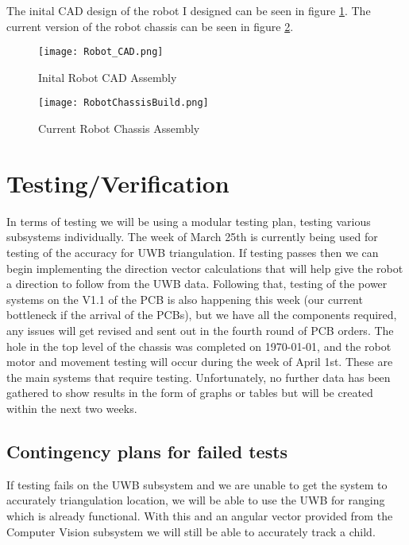 \documentclass{report}
\begin{document}
    The inital CAD design of the robot I designed can be seen in figure \ref{fig:Robot_CAD}. The current version of the robot chassis can be seen in figure \ref{fig:RobotChassisBuild}.

    \begin{figure}[ht!]
        \centering
        \texttt{[image: Robot\_CAD.png]}
        \caption{Inital Robot CAD Assembly}
        \label{fig:Robot_CAD}
    \end{figure}

    \begin{figure}[ht!]
        \centering
        \texttt{[image: RobotChassisBuild.png]}
        \caption{Current Robot Chassis Assembly}
        \label{fig:RobotChassisBuild}
    \end{figure}

    \section{Testing/Verification}
    \label{sec:Testing}
    In terms of testing we will be using a modular testing plan, testing various subsystems individually. The week of March 25th is currently being used for testing of the accuracy for UWB triangulation. If testing passes then we can begin implementing the direction vector calculations that will help give the robot a direction to follow from the UWB data. Following that, testing of the power systems on the V1.1 of the PCB is also happening this week (our current bottleneck if the arrival of the PCBs), but we have all the components required, any issues will get revised and sent out in the fourth round of PCB orders. The hole in the top level of the chassis was completed on \today, and the robot motor and movement testing will occur during the week of April 1st. These are the main systems that require testing. Unfortunately, no further data has been gathered to show results in the form of graphs or tables but will be created within the next two weeks.

    \subsection{Contingency plans for failed tests}
    If testing fails on the UWB subsystem and we are unable to get the system to accurately triangulation location, we will be able to use the UWB for ranging which is already functional. With this and an angular vector provided from the Computer Vision subsystem we will still be able to accurately track a child.
\end{document}
